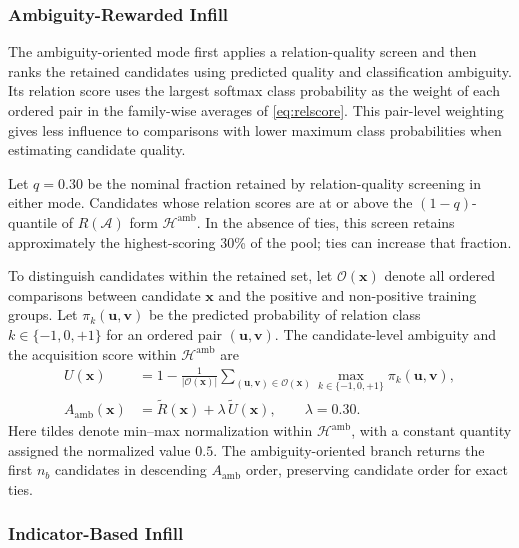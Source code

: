 \documentclass[final,5p,times,twocolumn]{elsarticle}
\newcommand{\vx}{\mathbf{x}}
\newcommand{\vv}{\mathbf{v}}
\newcommand{\vu}{\mathbf{u}}
\begin{document}
\subsubsection{Ambiguity-Rewarded Infill}
\label{sec:method:cdis:exp}

The ambiguity-oriented mode first applies a relation-quality screen and then
ranks the retained candidates using predicted quality and classification
ambiguity. Its relation score uses the
largest softmax class probability as the weight of each ordered pair in the
family-wise averages of \eqref{eq:relscore}. This pair-level weighting gives
less influence to comparisons with lower maximum class probabilities when
estimating candidate quality.

Let $q=0.30$ be the nominal fraction retained by relation-quality screening
in either mode. Candidates whose relation scores are at or above the
$(1-q)$-quantile of $R(\mathcal{A})$ form $\mathcal{H}^{\mathrm{amb}}$.
In the absence of ties, this screen retains approximately the highest-scoring
30\% of the pool; ties can increase that fraction.

To distinguish candidates within the retained set, let $\mathcal{O}(\vx)$
denote all ordered comparisons between candidate $\vx$ and the positive and
non-positive training groups. Let $\pi_k(\vu,\vv)$ be the predicted
probability of relation class $k\in\{-1,0,+1\}$ for an ordered pair
$(\vu,\vv)$. The candidate-level ambiguity and the acquisition score within
$\mathcal{H}^{\mathrm{amb}}$ are
\begin{equation}
\begin{aligned}
U(\vx)&=1-\frac{1}{|\mathcal{O}(\vx)|}
  \sum_{(\vu,\vv)\in\mathcal{O}(\vx)}
  \max_{k\in\{-1,0,+1\}}\pi_k(\vu,\vv),\\
A_{\mathrm{amb}}(\vx)&=\widetilde{R}(\vx)+\lambda\,\widetilde{U}(\vx),
  \qquad \lambda=0.30.
\end{aligned}
\label{eq:expscore}
\end{equation}
Here tildes denote min--max normalization within
$\mathcal{H}^{\mathrm{amb}}$, with a constant quantity assigned the normalized
value $0.5$. The ambiguity-oriented branch returns
the first $n_b$ candidates in descending $A_{\mathrm{amb}}$ order, preserving
candidate order for exact ties.

\subsubsection{Indicator-Based Infill}
\label{sec:method:cdis:ind}
\end{document}
